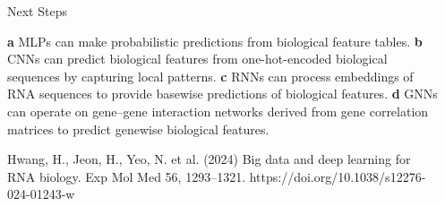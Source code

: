 \documentclass[final]{beamer}
\newlength{\sepwidth}
\newlength{\colwidth}
\newcommand{\separatorcolumn}{\begin{column}{\sepwidth}\end{column}}
\begin{document}
\begin{frame}[t]
\begin{columns}[t]
\begin{column}{\colwidth}
\begin{block}{Next Steps}
\begin{enumerate}
\small{\textbf{a }MLPs can make probabilistic predictions from biological feature tables. \textbf{b} CNNs can predict biological features from one-hot-encoded biological sequences by capturing local patterns.  \textbf{c} RNNs can process embeddings of RNA sequences to provide basewise predictions of biological features. \textbf{d} GNNs can operate on gene–gene interaction networks derived from gene correlation matrices to predict genewise biological features.} 

          \end{enumerate}

\small {Hwang, H., Jeon, H., Yeo, N. et al. (2024) Big data and deep learning for RNA biology. Exp Mol Med 56, 1293–1321. https://doi.org/10.1038/s12276-024-01243-w}

    \end{block}

%    





\end{column}
\separatorcolumn

\end{columns}
\end{frame}
\end{document}

